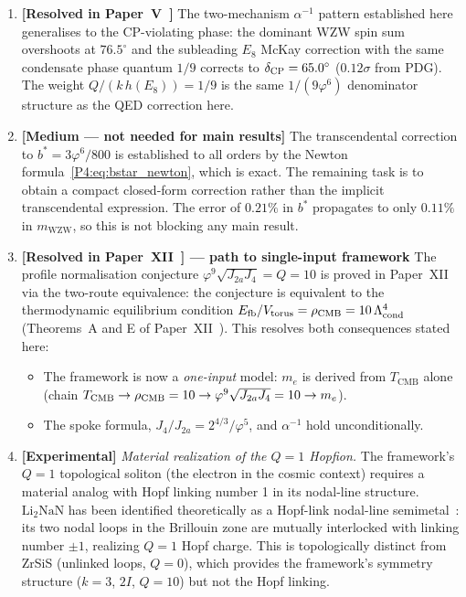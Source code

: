 \documentclass[11pt,a4paper]{article}
\theoremstyle{definition}
\theoremstyle{remark}
\newcommand{\vp}{\varphi}
\newcommand{\Ja}{J_{2a}}
\newcommand{\Jfour}{J_{4}}
\newcommand{\TCMB}{T_{\mathrm{CMB}}}
\newcommand{\aInv}{\alpha^{-1}}
\newcommand{\Lcond}{\Lambda_{\mathrm{cond}}}
\begin{document}
\begin{enumerate}[noitemsep]

\item \textbf{[Resolved in Paper~V~\cite{Paper5}]}
The two-mechanism $\aInv$ pattern established here generalises to the
CP-violating phase: the dominant WZW spin sum overshoots at $76.5^\circ$
and the subleading $E_8$ McKay correction with the same condensate phase
quantum $1/9$ corrects to $\delta_{\rm CP} = 65.0^\circ$ ($0.12\sigma$
from PDG).  The weight $Q/(k\,h(E_8)) = 1/9$ is the same $1/(9\vp^6)$
denominator structure as the QED correction here.

\item \textbf{[Medium --- not needed for main results]} The transcendental correction to $b^* = 3\vp^6/800$ is established to all orders by the Newton formula~\eqref{P4:eq:bstar_newton}, which is exact.  The remaining task is to 
obtain a compact closed-form correction rather than the implicit transcendental expression. The error of $0.21\%$ in $b^*$ propagates to only $0.11\%$ in $m_\mathrm{WZW}$, so this is not blocking any main result.

\item \textbf{[Resolved in Paper~XII~\cite{Paper12}] --- path to single-input framework}
The profile normalisation conjecture
$\vp^9\sqrt{\Ja\Jfour} = Q = 10$ is proved in Paper~XII
via the two-route equivalence: the conjecture is equivalent to the
thermodynamic equilibrium condition
$E_{\rm fb}/V_{\rm torus} = \rho_{\rm CMB} = 10\,\Lcond^4$
(Theorems~A and E of Paper~XII~\cite{Paper12}).
This resolves both consequences stated here:

\begin{itemize}[noitemsep]
  \item The framework is now a \emph{one-input} model:
    $m_e$ is derived from $\TCMB$ alone
    (chain $\TCMB\to\rho_{\rm CMB}=10\to\vp^9\sqrt{\Ja\Jfour}=10\to m_e$).
  \item The spoke formula, $J_4/J_{2a}=2^{4/3}/\vp^5$, and
    $\alpha^{-1}$ hold unconditionally.
\end{itemize}

\item \textbf{[Experimental]} \textit{Material realization of the \texorpdfstring{$Q=1$}{Q=1} Hopfion.}
The framework's $Q=1$ topological soliton (the electron in the cosmic context)
requires a material analog with Hopf linking number 1 in its nodal-line structure.
$\mathrm{Li_2NaN}$ has been identified theoretically as a Hopf-link nodal-line
semimetal~\cite{Li2NaN2017,Li2NaN2018}: its two nodal loops in the Brillouin zone
are mutually interlocked with linking number $\pm 1$, realizing $Q=1$ Hopf charge.
This is topologically distinct from ZrSiS (unlinked loops, $Q=0$), which provides
the framework's symmetry structure ($k=3$, $2I$, $Q=10$) but not the Hopf linking.


\end{enumerate}
\end{document}
